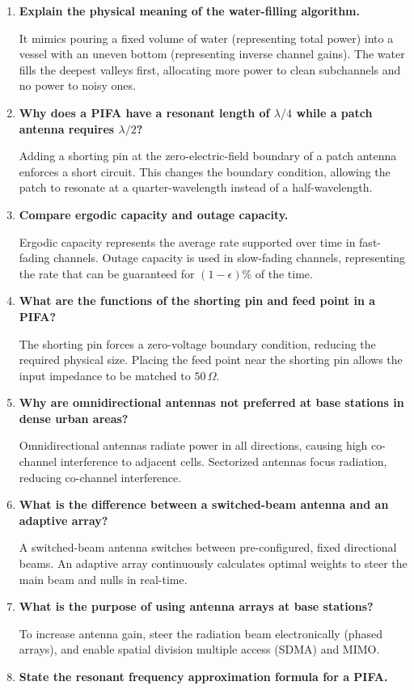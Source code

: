 \documentclass[12pt,a4paper]{article}
\newcommand{\Q}[1]{\textbf{#1}\par\noindent\ignorespaces}
\begin{document}
\begin{tcolorbox}[exambox, title={\textbf{Frequently Asked / Viva Questions}}]
\begin{enumerate}[topsep=0pt, label=\textbf{Q\arabic*.}, itemsep=5pt]
  \item \Q{Explain the physical meaning of the water-filling algorithm.}
    It mimics pouring a fixed volume of water (representing total power) into a vessel with an uneven bottom (representing inverse channel gains). The water fills the deepest valleys first, allocating more power to clean subchannels and no power to noisy ones.
  \item \Q{Why does a PIFA have a resonant length of $\lambda/4$ while a patch antenna requires $\lambda/2$?}
    Adding a shorting pin at the zero-electric-field boundary of a patch antenna enforces a short circuit. This changes the boundary condition, allowing the patch to resonate at a quarter-wavelength instead of a half-wavelength.
  \item \Q{Compare ergodic capacity and outage capacity.}
    Ergodic capacity represents the average rate supported over time in fast-fading channels. Outage capacity is used in slow-fading channels, representing the rate that can be guaranteed for $(1-\epsilon)\%$ of the time.
  \item \Q{What are the functions of the shorting pin and feed point in a PIFA?}
    The shorting pin forces a zero-voltage boundary condition, reducing the required physical size. Placing the feed point near the shorting pin allows the input impedance to be matched to $50\,\Omega$.
  \item \Q{Why are omnidirectional antennas not preferred at base stations in dense urban areas?}
    Omnidirectional antennas radiate power in all directions, causing high co-channel interference to adjacent cells. Sectorized antennas focus radiation, reducing co-channel interference.
  \item \Q{What is the difference between a switched-beam antenna and an adaptive array?}
    A switched-beam antenna switches between pre-configured, fixed directional beams. An adaptive array continuously calculates optimal weights to steer the main beam and nulls in real-time.
  \item \Q{What is the purpose of using antenna arrays at base stations?}
    To increase antenna gain, steer the radiation beam electronically (phased arrays), and enable spatial division multiple access (SDMA) and MIMO.
  \item \Q{State the resonant frequency approximation formula for a PIFA.}

\end{enumerate}
\end{tcolorbox}
\end{document}
